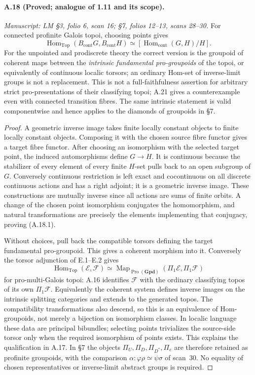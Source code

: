 \paragraph{A.18 (Proved; analogue of 1.11 and its scope).}
\textit{Manuscript: LM \S3, folio 6, scan 16; \S7, folios 12--13, scans 28--30.}
For connected profinite Galois topoi, choosing points gives
\[
 \operatorname{Hom}_{\mathrm{Top}}(B_{\mathrm{cont}}G,
                                  B_{\mathrm{cont}}H)
 \simeq[\operatorname{Hom}_{\mathrm{cont}}(G,H)/H].
                                                        \tag{A.18.1}
\]
For the unpointed and prodiscrete theory the correct version is the groupoid of coherent maps between the \emph{intrinsic fundamental pro-groupoids} of the topoi, or equivalently of continuous localic torsors; an ordinary Hom-set of inverse-limit groups is not a replacement. This is not a full-faithfulness assertion for arbitrary strict pro-presentations of their classifying topoi; A.21 gives a counterexample even with connected transition fibres. The same intrinsic statement is valid componentwise and hence applies to the diamonds of groupoids in \S7.
\begin{proof}
A geometric inverse image takes finite locally constant objects to finite locally constant objects. Composing it with the chosen source fibre functor gives a target fibre functor. After choosing an isomorphism with the selected target point, the induced automorphisms define $G\to H$. It is continuous because the stabilizer of every element of every finite $H$-set pulls back to an open subgroup of $G$. Conversely continuous restriction is left exact and cocontinuous on all discrete continuous actions and has a right adjoint; it is a geometric inverse image. These constructions are mutually inverse since all actions are sums of finite orbits. A change of the chosen point isomorphism conjugates the homomorphism, and natural transformations are precisely the elements implementing that conjugacy, proving (A.18.1).

Without choices, pull back the compatible torsors defining the target fundamental pro-groupoid. This gives a coherent morphism into it. Conversely the torsor adjunction of E.1--E.2 gives
\[
 \operatorname{Hom}_{\mathrm{Top}}(\mathcal E,\mathcal F)
 \simeq\operatorname{Map}_{\operatorname{Pro}(\mathbf{Gpd})}
             (\Pi_1\mathcal E,\Pi_1\mathcal F)
\]
for pro-multi-Galois topoi: A.16 identifies $\mathcal F$ with the ordinary classifying topos of its own $\Pi_1\mathcal F$. Equivalently the coherent system defines inverse images on the intrinsic splitting categories and extends to the generated topos. The compatibility transformations also descend, so this is an equivalence of Hom-groupoids, not merely a bijection on isomorphism classes. In localic language these data are principal bibundles; selecting points trivializes the source-side torsor only when the required isomorphism of points exists. This explains the qualification in A.17. In \S7 the objects $\Pi_U,\Pi_D,\Pi_{D^*},\Pi_e$ are therefore retained as profinite groupoids, with the comparison $\alpha:\varphi\rho\simeq\psi\sigma$ of scan~30. No equality of chosen representatives or inverse-limit abstract groups is required. 
\end{proof}

